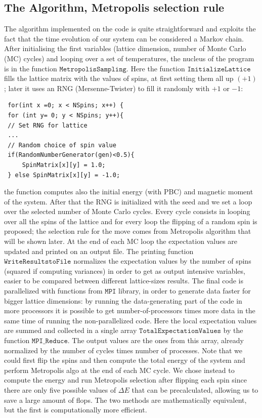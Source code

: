 \documentclass[%
 reprint,
 amsmath,amssymb,
 aps,
]{revtex4-1}
\theoremstyle{plain}
\theoremstyle{definition}
\theoremstyle{plain}
\begin{document}
	\subsection{The Algorithm, Metropolis selection rule}
	The algorithm implemented on the code is quite straightforward and exploits the fact that the time evolution of our system can be considered a Markov chain. 
	After initialising the first variables (lattice dimension, number of Monte Carlo (MC) cycles) and looping over a set of temperatures, the nucleus of the program is in the function $\mathtt{MetropolisSampling}$. Here the function $\mathtt{InitializeLattice}$ fills the lattice matrix with the values of spins, at first setting them all up $(+1)$; later it uses an RNG (Mersenne-Twister) to fill it randomly with $+1$ or $-1$:
	\begin{lstlisting}
 for(int x =0; x < NSpins; x++) {
 for (int y= 0; y < NSpins; y++){
 // Set RNG for lattice
 ...
 // Random choice of spin value
 if(RandomNumberGenerator(gen)<0.5){
 	 SpinMatrix[x][y] = 1.0;
 } else SpinMatrix[x][y] = -1.0;
	\end{lstlisting}
	the function computes also the initial energy (with PBC) and magnetic moment of the system.
	After that the RNG is initialized with the seed and we set a loop over the selected number of Monte Carlo cycles.
	Every cycle consists in looping over all the spins of the lattice and for every loop the flipping of a random spin is proposed; the selection rule for the move comes from Metropolis algorithm that will be shown later. At the end of each MC loop the expectation values are updated and printed on an output file. The printing function $\mathtt{WriteResultstoFile}$ normalizes the expectation values by the number of spins (squared if computing variances) in order to get as output intensive variables, easier to be compared between different lattice-sizes results.
	The final code is parallelized with functions from $\mathtt{MPI}$ library, in order to generate data faster for bigger lattice dimensions: by running the data-generating part of the code in more processors it is possible to get number-of-processors times more data in the same time of running the non-parallelized code. Here the local expectation values are summed and collected in a single array $\mathtt{TotalExpectationValues}$ by the function $\mathtt{MPI\_Reduce}$. The output values are the ones from this array, already normalized by the number of cycles times number of processes.
	Note that we could first flip the spins and then compute the total energy of the system and perform Metropolis algo at the end of each MC cycle. We chose instead to compute the energy and run Metropolis selection after flipping each spin since there are only five possible values of $\Delta E$ that can be precalculated, allowing us to save a large amount of flops. The two methods are mathematically equivalent, but the first is computationally more efficient.\\
	
\end{document}
